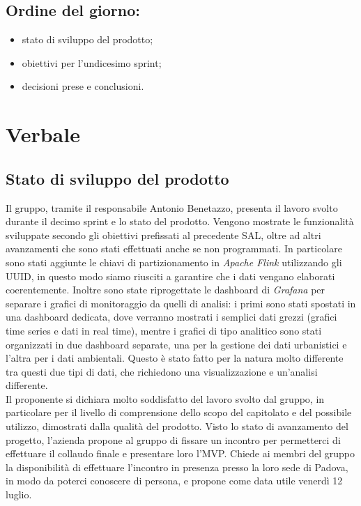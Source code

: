 \documentclass[italian,12pt]{article}
\begin{document}
\subsection*{Ordine del giorno:}
\begin{itemize}
	\item stato di sviluppo del prodotto;
	\item obiettivi per l'undicesimo sprint;
	\item decisioni prese e conclusioni.
\end{itemize}

\newpage

\section{Verbale}

\subsection{Stato di sviluppo del prodotto}
Il gruppo, tramite il responsabile Antonio Benetazzo, presenta il lavoro svolto durante il decimo sprint e lo stato del prodotto. Vengono mostrate le funzionalità sviluppate secondo gli obiettivi prefissati al precedente SAL, oltre ad altri avanzamenti che sono stati effettuati anche se non programmati. In particolare sono stati aggiunte le chiavi di partizionamento in \textit{Apache Flink} utilizzando gli UUID, in questo modo siamo riusciti a garantire che i dati vengano elaborati coerentemente. Inoltre sono state riprogettate le dashboard di \textit{Grafana} per separare i grafici di monitoraggio da quelli di analisi: i primi sono stati spostati in una dashboard dedicata, dove verranno mostrati i semplici dati grezzi (grafici time series e dati in real time), mentre i grafici di tipo analitico sono stati organizzati in due dashboard separate, una per la gestione dei dati urbanistici e l'altra per i dati ambientali. Questo è stato fatto per la natura molto differente tra questi due tipi di dati, che richiedono una visualizzazione e un'analisi differente. \\
Il proponente si dichiara molto soddisfatto del lavoro svolto dal gruppo, in particolare per il livello di comprensione dello scopo del capitolato e del possibile utilizzo, dimostrati dalla qualità del prodotto. Visto lo stato di avanzamento del progetto, l'azienda propone al gruppo di fissare un incontro per permetterci di effettuare il collaudo finale e presentare loro l'MVP. Chiede ai membri del gruppo la disponibilità di effettuare l'incontro in presenza presso la loro sede di Padova, in modo da poterci conoscere di persona, e propone come data utile venerdì 12 luglio.
\end{document}
